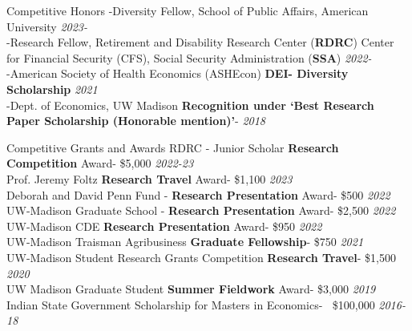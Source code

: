 \documentclass{resume} %
\begin{document}
\begin{rSection}{Competitive Honors}
-Diversity Fellow, School of Public Affairs, American University \hfill \textit{2023-} \\
-Research Fellow, Retirement and Disability Research Center (\textbf{RDRC}) Center for Financial Security (CFS), Social Security Administration (\textbf{SSA})  \hfill \textit{2022-} \\
-American Society of Health Economics (ASHEcon) \textbf{DEI- Diversity Scholarship} \hfill \textit{2021} \\
-Dept. of Economics, UW Madison \textbf{Recognition under `Best Research Paper Scholarship (Honorable mention)'}- \hfill \textit{2018}
\end{rSection}




\begin{rSection}{Competitive Grants and Awards}
RDRC - Junior Scholar \textbf{Research Competition} Award- \$5,000 \hfill \textit{2022-23}	\\
Prof. Jeremy Foltz \textbf{Research Travel} Award- \$1,100 \hfill \textit{2023}	\\
Deborah and David Penn Fund - \textbf{Research Presentation} Award- \$500 \hfill \textit{2022}	\\
UW-Madison Graduate School - \textbf{Research Presentation} Award- \$2,500 \hfill \textit{2022}	\\
UW-Madison CDE \textbf{Research Presentation} Award- \$950 \hfill \textit{2022} \\
UW-Madison Traisman Agribusiness \textbf{Graduate Fellowship}- \$750 \hfill \textit{2021}	\\
UW-Madison Student Research Grants Competition \textbf{Research Travel}- \$1,500 \hfill \textit{2020}  \\
UW Madison Graduate Student \textbf{Summer Fieldwork} Award- \$3,000  \hfill \textit{2019}\\
Indian State Government Scholarship for Masters in Economics- $~$ \$100,000 \hfill \textit{2016-18}

\end{rSection}
\end{document}
